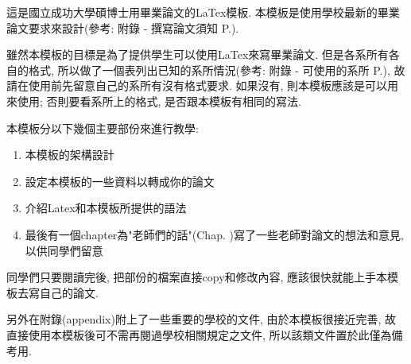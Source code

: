 

這是國立成功大學碩博士用畢業論文的LaTex模板. 本模板是使用學校最新的畢業論文要求來設計(參考: 附錄 - 撰寫論文須知 P.).

雖然本模板的目標是為了提供學生可以使用LaTex來寫畢業論文. 但是各系所有各自的格式, 所以做了一個表列出已知的系所情況(參考: 附錄 - 可使用的系所 P.), 故請在使用前先留意自己的系所有沒有格式要求. 如果沒有, 則本模板應該是可以用來使用; 否則要看系所上的格式, 是否跟本模板有相同的寫法.

本模板分以下幾個主要部份來進行教學:
\begin{enumerate}
  \item 本模板的架構設計
  \item 設定本模板的一些資料以轉成你的論文
  \item 介紹Latex和本模板所提供的語法
  \item 最後有一個chapter為"老師們的話"(Chap. )寫了一些老師對論文的想法和意見, 以供同學們留意
\end{enumerate}
同學們只要閱讀完後, 把部份的檔案直接copy和修改內容, 應該很快就能上手本模板去寫自己的論文.

另外在附錄(appendix)附上了一些重要的學校的文件, 由於本模板很接近完善, 故直接使用本模板後可不需再閱過學校相關規定之文件, 所以該類文件置於此僅為備考用.



